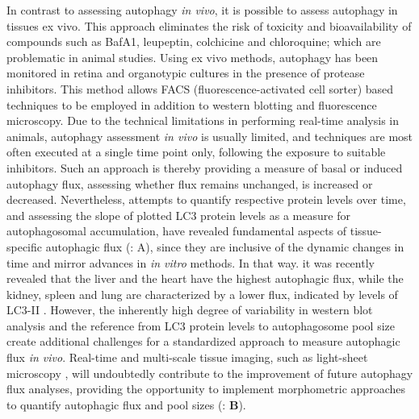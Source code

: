 In contrast to assessing autophagy \textit{in vivo}, it is possible to assess autophagy in tissues ex vivo. This approach eliminates the risk of toxicity and bioavailability of compounds such as BafA1, leupeptin, colchicine and chloroquine; which are problematic in animal studies. Using ex vivo methods, autophagy has been monitored in retina \citep{Esteban-Martinez2015} and organotypic cultures in the presence of protease inhibitors. This method allows FACS (fluorescence-activated cell sorter) based techniques to be employed in addition to western blotting and fluorescence microscopy. Due to the technical limitations in performing real-time analysis in animals, autophagy assessment \textit{in vivo} is usually limited, and techniques are most often executed at a single time point only, following the exposure to suitable inhibitors. Such an approach is thereby providing a measure of basal or induced autophagy flux, assessing whether flux remains unchanged, is increased or decreased. Nevertheless, attempts to quantify respective protein levels over time, and assessing the slope of plotted LC3 protein levels as a measure for autophagosomal accumulation, have revealed fundamental aspects of tissue-specific autophagic flux \citep{Haspel2011} (: A), since they are inclusive of the dynamic changes in time and mirror advances in \textit{in vitro} methods. In that way. it was recently revealed that the liver and the heart have the highest autophagic flux, while the kidney, spleen and lung are characterized by a lower flux, indicated by levels of LC3-II \citep{Haspel2011}. However, the inherently high degree of variability in western blot analysis and the reference from LC3 protein levels to autophagosome pool size create additional challenges for a standardized approach to measure autophagic flux \textit{in vivo}. Real-time and multi-scale tissue imaging, such as light-sheet microscopy \citep{Pampaloni2013}, will undoubtedly contribute to the improvement of future autophagy flux analyses, providing the opportunity to implement morphometric approaches to quantify autophagic flux and pool sizes (: \textbf{B}). 


